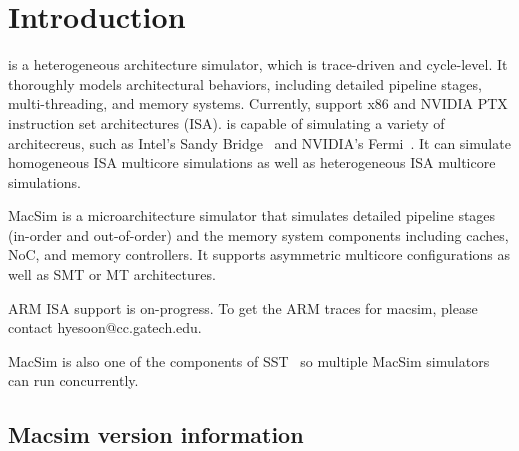 


\chapter{Introduction}


\SIM is a heterogeneous architecture simulator, which is trace-driven
and cycle-level. It thoroughly models architectural behaviors,
including detailed pipeline stages, multi-threading, and memory
systems. Currently, \SIM support x86 and NVIDIA PTX instruction set
architectures (ISA). \SIM is capable of simulating a variety of
architecreus, such as Intel's Sandy Bridge~\cite{sandybridge} and
NVIDIA's Fermi~\cite{fermi}.  It can simulate homogeneous ISA
multicore simulations as well as heterogeneous ISA multicore
simulations.

MacSim is a microarchitecture simulator that simulates detailed
pipeline stages (in-order and out-of-order) and the memory system components 
including caches, NoC, and memory controllers. It supports asymmetric 
multicore configurations as well as SMT or MT architectures.


ARM ISA support is on-progress. To get the ARM traces for macsim,
please contact hyesoon@cc.gatech.edu. 

MacSim is also one of the components of SST~\cite{sst} so
multiple MacSim simulators can run concurrently.





\section*{Macsim version information}


